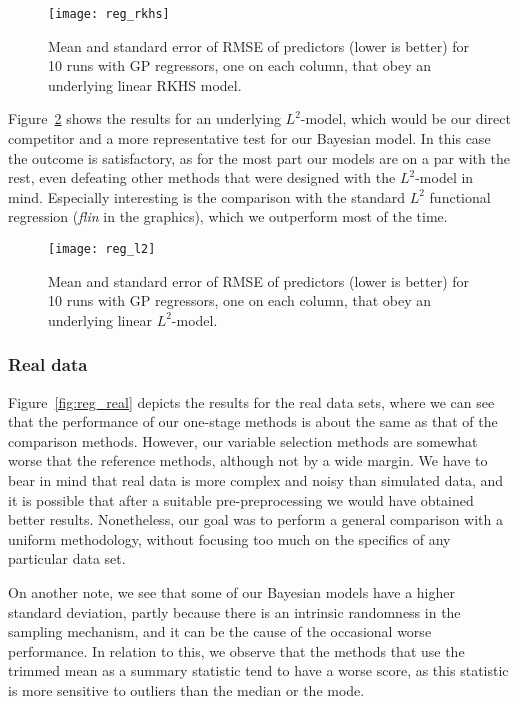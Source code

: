\documentclass{article}
\numberwithin{equation}{section}
\theoremstyle{plain}
\theoremstyle{definition}
\begin{document}
\begin{figure}[ht!]
  \centering
  \texttt{[image: reg\_rkhs]}
  \caption{Mean and standard error of RMSE of predictors (lower is better) for 10 runs with GP regressors, one on each column, that obey an underlying linear RKHS model.}\label{fig:reg_rkhs}
\end{figure}

Figure~\ref{fig:reg_l2} shows the results for an underlying \(L^2\)-model, which would be our direct competitor and a more representative test for our Bayesian model. In this case the outcome is satisfactory, as for the most part our models are on a par with the rest, even defeating other methods that were designed with the \(L^2\)-model in mind. Especially interesting is the comparison with the standard \(L^2\) functional regression (\textit{flin} in the graphics), which we outperform most of the time.

\begin{figure}[ht!]
  \centering
  \texttt{[image: reg\_l2]}
  \caption{Mean and standard error of RMSE of predictors (lower is better) for 10 runs with GP regressors, one on each column, that obey an underlying linear \(L^2\)-model.}\label{fig:reg_l2}
\end{figure}

\subsubsection*{Real data}

Figure~\ref{fig:reg_real} depicts the results for the real data sets, where we can see that the performance of our one-stage methods is about the same as that of the comparison methods. However, our variable selection methods are somewhat worse that the reference methods, although not by a wide margin. We have to bear in mind that real data is more complex and noisy than simulated data, and it is possible that after a suitable pre-preprocessing we would have obtained better results. Nonetheless, our goal was to perform a general comparison with a uniform methodology, without focusing too much on the specifics of any particular data set. 

On another note, we see that some of our Bayesian models have a higher standard deviation, partly because there is an intrinsic randomness in the sampling mechanism, and it can be the cause of the occasional worse performance. In relation to this, we observe that the methods that use the trimmed mean as a summary statistic tend to have a worse score, as this statistic is more sensitive to outliers than the median or the mode.
\end{document}
